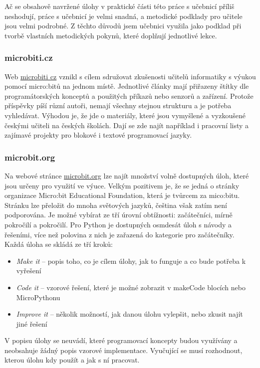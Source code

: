 \documentclass[
  digital,     %
  oneside,     %
  nosansbold,  %
  colorbold, %
  lof,         %
  nolot,         %
]{fithesis4}
\begin{document}
Ač se obsahově navržené úlohy v praktické části této práce s učebnicí příliš neshodují, práce s učebnicí je velmi snadná, a metodické podklady pro učitele jsou velmi podrobné. Z těchto důvodů jsem učebnici využila jako podklad při tvorbě vlastních metodických pokynů, které doplňují jednotlivé lekce.

\subsubsection{microbiti.cz}
Web \href{microbiti.cz}{microbiti cz} vznikl s cílem sdružovat zkušenosti učitelů informatiky s výukou pomocí micro:bitů na jednom místě. Jednotlivé články mají přiřazeny štítky dle programátorských konceptů a použitých příkazů nebo senzorů a zařízení. Protože příspěvky píší různí autoři, nemají všechny stejnou strukturu a je potřeba vyhledávat. Výhodou je, že jde o materiály, které jsou vymyšlené a vyzkoušené českými učiteli na českých školách. Dají se zde najít například i pracovní listy a zajímavé projekty pro blokové i textové programovací jazyky.

\subsubsection{microbit.org}
Na webové stránce \href{https://microbit.org/teach/classroom-resources/}{microbit.org} lze najít množství volně dostupných úloh, které jsou určeny pro využití ve výuce. Velkým pozitivem je, že se jedná o stránky organizace Micro:bit Educational Foundation, která je tvůrcem za mico:bitu. Stránku lze přeložit do mnoha světových jazyků, čeština však zatím není podporována. Je možné vybírat ze tří úrovní obtížnosti: začátečníci, mírně pokročilí a pokročilí. Pro Python je dostupných osmdesát úloh s návody a řešeními, více než polovina z nich je zařazená do kategorie pro začátečníky. Každá úloha se skládá ze tří kroků:
\begin{itemize}
    \item \textit{Make it} -- popis toho, co je cílem úlohy, jak to funguje a co bude potřeba k vyřešení
    \item \textit{Code it} -- vzorové řešení, které je možné zobrazit v makeCode blocích nebo MicroPythonu
    \item \textit{Improve it} -- několik možností, jak danou úlohu vylepšit, nebo zkusit najít jiné řešení
\end{itemize}
V popisu úlohy se neuvádí, které programovací koncepty budou využívány a neobsahuje žádný popis vzorové implementace. Vyučující se musí rozhodnout, kterou úlohu kdy použít a jak s ní pracovat.
\end{document}

